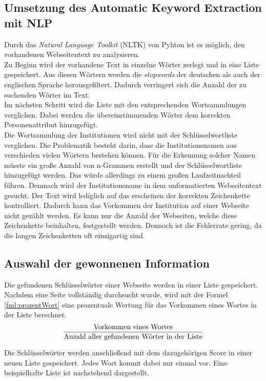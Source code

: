 	\subsection{Umsetzung des Automatic Keyword Extraction mit NLP}
		\label{subsec:AutomaticKeywordExtractionNLP}
		Durch das \textit{Natural Language Toolkit} (NLTK) von Pyhton ist es möglich, den vorhandenen Webseitentext zu analysieren.\\
		Zu Beginn wird der vorhandene Text in einzelne Wörter zerlegt und in eine Liste gespeichert. Aus diesen Wörtern werden die \textit{stopwords} der deutschen als auch der englischen Sprache herausgefiltert. Dadurch verringert sich die Anzahl der zu suchenden Wörter im Text. \\
		Im nächsten Schritt wird die Liste mit den entsprechenden Wortsammlungen verglichen. Dabei werden die übereinstimmenden Wörter dem korrekten Personenattribut hinzugefügt.\\
		Die Wortsammlung der Institutionen wird nicht mit der Schlüsselwortliste verglichen. Die Problematik besteht darin, dass die Institutionsnamen aus verschieden vielen Wörtern bestehen können. Für die Erkennung solcher Namen müsste ein große Anzahl von n-Grammen erstellt und der Schlüsselwortliste hinzugefügt werden. Das würde allerdings zu einem großen Laufzeitnachteil führen. Demnach wird der Institutionsname in dem unformatierten Webseitentext gesucht. Der Text wird lediglich auf das erscheinen der korrekten Zeichenkette kontrolliert. Dadurch kann das Vorkommen der Institution auf einer Webseite nicht gezählt werden. Es kann nur die Anzahl der Webseiten, welche diese Zeichenkette beinhalten, festgestellt werden. Dennoch ist die Fehlerrate gering, da die langen Zeichenketten oft einzigartig sind.
		
	\subsection{Auswahl der gewonnenen Information}
		\label{subsec:AuswahlInformation}
		Die gefundenen Schlüsselwörter einer Webseite werden in einer Liste gespeichert. Nachdem eine Seite vollständig durchsucht wurde, wird mit der Formel \ref{fml:prozentWort} eine prozentuale Wertung für das Vorkommen eines Wortes in der Liste berechnet.
		\begin{align}%
		\label{fml:prozentWort}
		\begin{split}%
		&\frac{\text{Vorkommen eines Wortes}}{\text{Anzahl aller gefundenen Wörter in der Liste}}\\[0.25\baselineskip]%
		\end{split}
		\end{align}
		Die Schlüsselwörter werden anschließend mit dem dazugehörigen Score in einer neuen Liste gespeichert. Jedes Wort kommt dabei nur einmal vor. Eine beispielhafte Liste ist nachstehend dargestellt.
		
